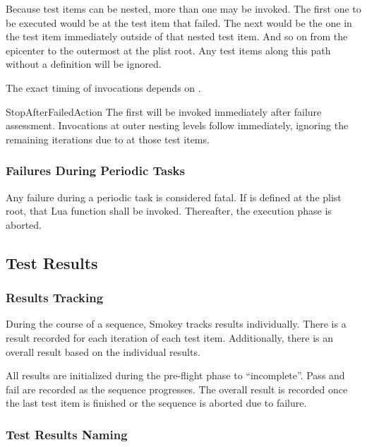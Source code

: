 Because test items can be nested, more than one  may be
invoked.  The first one to be executed would be at the test item that failed.
The next would be the one in the test item immediately outside of that nested
test item.  And so on from the epicenter to the outermost  at
the plist root.  Any test items  along this path without a 
definition will be ignored.

The exact timing of  invocations depends on
.

\begin{Definition}

\item[StopAfterFailedAction] The first  will be invoked
immediately after failure assessment.  Invocations at outer nesting levels
follow immediately, ignoring the remaining iterations due to
 at those test items.

\end{Definition}

\subsubsection{Failures During Periodic Tasks}

Any failure during a periodic task is considered fatal.  If 
is defined at the plist root, that Lua function shall be invoked.  Thereafter,
the execution phase is aborted.

\subsection{Test Results}

\subsubsection{Results Tracking}

During the course of a sequence, Smokey tracks results individually.  There is
a result recorded for each iteration of each test item.  Additionally, there is
an overall result based on the individual results. 

All results are initialized during the pre-flight phase to ``incomplete''.
Pass and fail are recorded as the sequence progresses.  The overall result is
recorded once the last test item is finished or the sequence is aborted due to
failure.

\subsubsection{Test Results Naming}


